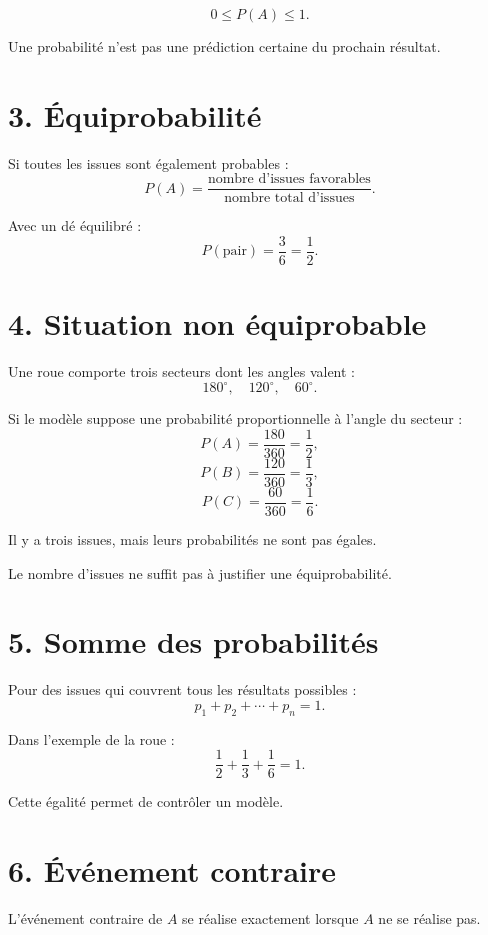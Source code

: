 \[
\boxed{0\le P(A)\le1}.
\]

Une probabilité n'est pas une prédiction certaine du prochain résultat.

\section{3. Équiprobabilité}

Si toutes les issues sont également probables :
\[
P(A)=\dfrac{\text{nombre d'issues favorables}}{\text{nombre total d'issues}}.
\]

Avec un dé équilibré :
\[
P(\text{pair})=\dfrac36=\dfrac12.
\]

\section{4. Situation non équiprobable}

Une roue comporte trois secteurs dont les angles valent :
\[
180^\circ,\quad120^\circ,\quad60^\circ.
\]

Si le modèle suppose une probabilité proportionnelle à l'angle du secteur :
\[
P(A)=\dfrac{180}{360}=\dfrac12,
\]
\[
P(B)=\dfrac{120}{360}=\dfrac13,
\]
\[
P(C)=\dfrac{60}{360}=\dfrac16.
\]

Il y a trois issues, mais leurs probabilités ne sont pas égales.

\begin{attention}
Le nombre d'issues ne suffit pas à justifier une équiprobabilité.
\end{attention}

\section{5. Somme des probabilités}

Pour des issues qui couvrent tous les résultats possibles :
\[
\boxed{p_1+p_2+\cdots+p_n=1}.
\]

Dans l'exemple de la roue :
\[
\dfrac12+\dfrac13+\dfrac16=1.
\]

Cette égalité permet de contrôler un modèle.

\section{6. Événement contraire}

L'événement contraire de $A$ se réalise exactement lorsque $A$ ne se réalise pas.



